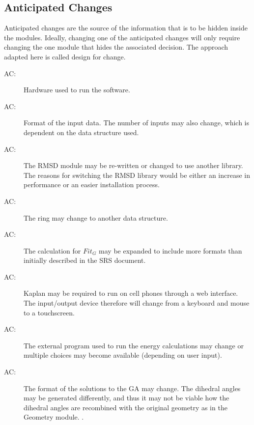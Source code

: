\documentclass[12pt, titlepage]{article}
\newcounter{acnum}
\newcommand{\actheacnum}{AC\theacnum}
\newcommand{\progname}{Kaplan} %
\begin{document}
\subsection{Anticipated Changes} \label{SecAchange}

Anticipated changes are the source of the information that is to be hidden
inside the modules. Ideally, changing one of the anticipated changes will only
require changing the one module that hides the associated decision. The approach
adapted here is called design for
change.

\begin{description}
\item[ \actheacnum \label{acHardware}:] Hardware used to 
run the software.
\item[ \actheacnum \label{acInput}:] Format of the input 
data. The number of inputs may also change, which is dependent on the data 
structure used. 
\item[ \actheacnum \label{acRMSD}:] The RMSD module may 
be re-written or changed to use another library. The reasons for switching the 
RMSD library would be either an increase in performance or an easier 
installation process.
\item[ \actheacnum \label{acRing}:] The ring may change 
to another data structure.  
\item[ \actheacnum \label{acFit_G}:] The calculation for 
$Fit_G$ may be expanded to include more formats than initially described in the 
SRS document.

\item[ \actheacnum \label{acOutputDevice}:] \progname{} 
may be required to run on cell phones through a web 
interface. The input/output device therefore will change from a keyboard and 
mouse to a touchscreen.
\item[ \actheacnum \label{acEnergy}:] The external 
program used to run the energy calculations may change or multiple choices may 
become available (depending on user input).
\item[ \actheacnum \label{acGeometry}:] The format of the 
solutions to the GA may change. The dihedral angles may be generated 
differently, and thus it may not be viable how the dihedral angles are 
recombined with the original geometry as in the Geometry module.
.
\end{description}
\end{document}

